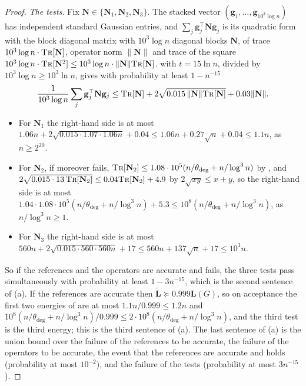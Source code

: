 \documentclass[11pt]{article}
\theoremstyle{remark}
\renewcommand{\gg}{{\mathbf g}}
\newcommand{\LL}{\mathbf L}
\newcommand{\LLtil}{{\widetilde{\LL}}}
\newcommand{\NN}{\mathbf N}
\newcommand{\dheavy}{\theta_{\deg}}
\newcommand{\norm}[1]{\lVert#1\rVert}
\newcommand{\tr}{\textsc{Tr}}
\begin{document}
\begin{proof}
\emph{The tests.}
Fix $\NN\in\{\NN_1,\NN_2,\NN_3\}$.
The stacked vector $(\gg_1,\dots,\gg_{10^{3}\log n})$ has independent standard
Gaussian entries, and $\sum_j\gg_j^{\top}\NN\gg_j$ is its quadratic form with
the block diagonal matrix with $10^{3}\log n$ diagonal blocks $\NN$, of
trace $10^{3}\log n\cdot\tr[\NN]$, operator norm $\norm{\NN}$ and trace of
the square $10^{3}\log n\cdot\tr[\NN^{2}]\le10^{3}\log n\cdot\norm{\NN}\tr[\NN]$.
 with $t=15\ln n$, divided by $10^{3}\log n\ge10^{3}\ln n$,
gives with probability at least $1-n^{-15}$
\begin{equation}\label{eq:tail}
\frac1{10^{3}\log n}\sum_j\gg_j^{\top}\NN\gg_j
\le\tr[\NN]+2\sqrt{0.015\,\norm{\NN}\tr[\NN]}+0.03\norm{\NN} .
\end{equation}
\begin{itemize}[leftmargin=*]
\item For $\NN_1$ the right-hand side is at most
$1.06n+2\sqrt{0.015\cdot1.07\cdot1.06n}+0.04\le1.06n+0.27\sqrt n+0.04\le1.1n$,
as $n\ge2^{20}$.
\item For $\NN_2$, if moreover  fails,
$\tr[\NN_2]\le1.08\cdot10^{5}(n/\dheavy+n/\log^{3}n)$ by ,
and $2\sqrt{0.015\cdot13\,\tr[\NN_2]}\le0.04\tr[\NN_2]+4.9$ by
$2\sqrt{xy}\le x+y$, so the right-hand side is at most
$1.04\cdot1.08\cdot10^{5}(n/\dheavy+n/\log^{3}n)+5.3\le10^{8}(n/\dheavy+n/\log^{3}n)$,
as $n/\log^{3}n\ge1$.
\item For $\NN_3$ the right-hand side is at most
$560n+2\sqrt{0.015\cdot560\cdot560n}+17\le560n+137\sqrt n+17\le10^{3}n$.
\end{itemize}
So if the references and the operators are accurate and 
fails, the three tests pass simultaneously with probability at least
$1-3n^{-15}$, which is the second sentence of (a).
If the references are accurate then $\LLtil\succeq0.999\LL(G)$, so on
acceptance the first two energies of  are at most
$1.1n/0.999\le1.2n$ and $10^{8}(n/\dheavy+n/\log^{3}n)/0.999\le2\cdot10^{8}(n/\dheavy+n/\log^{3}n)$,
and the third test is the third energy; this is the third sentence of (a).
The last sentence of (a) is the union bound over the failure of the
references to be accurate, the failure of the operators to be accurate,
the event that the references are accurate and  holds
(probability at most $10^{-2}$), and the failure of the tests
(probability at most $3n^{-15}$).


\end{proof}
\end{document}
